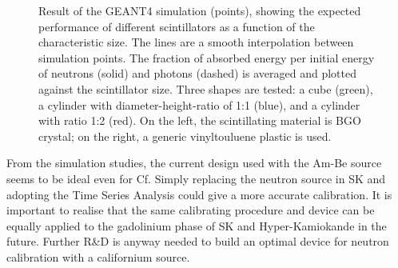\begin{figure}
	\centering
	\resizebox{\textwidth}{!}{}
	\caption[Performance of different scintillators from the simulation of a neutron calibration device]%
	{Result of the GEANT4 simulation (points), showing the expected performance of different scintillators %
		as a function of the characteristic size.
		The lines are a smooth interpolation between simulation points.
		The fraction of absorbed energy per initial energy of neutrons (solid) and photons (dashed) %
		is averaged and plotted against the scintillator size.
		Three shapes are tested: a cube (green), a cylinder with diameter-height-ratio of 1:1 (blue), %
		and a cylinder with ratio 1:2 (red).
		On the left, the scintillating material is BGO crystal; on the right, %
		a generic vinyltouluene plastic is used.}
	\label{fig:geant4}
\end{figure}


From the simulation studies, the current design used with the Am-Be source seems to be ideal %
even for Cf.
Simply replacing the neutron source in SK and adopting the Time Series Analysis could give a more accurate calibration.
It is important to realise that the same calibrating procedure and device can be equally applied %
to the gadolinium phase of SK and Hyper-Kamiokande in the future.
Further R\&D is anyway needed to build an optimal device for neutron calibration with a californium source.

